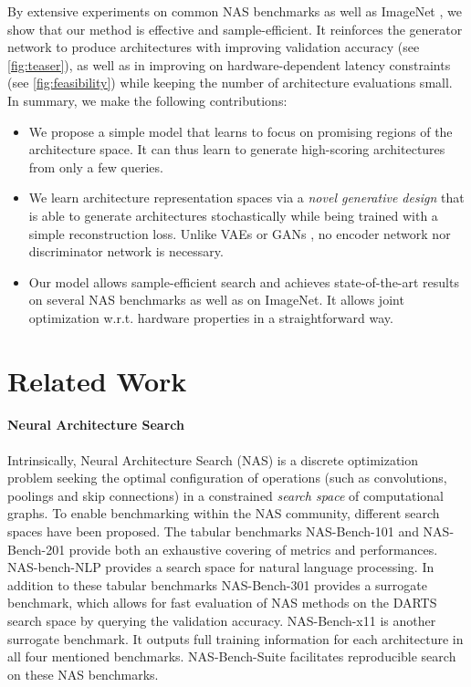 \documentclass[runningheads]{llncs}
\begin{document}
By extensive experiments on common NAS benchmarks \cite{2019NB101,2020NB201,2020NB301,2020NBNLP,2021HWNNB} as well as ImageNet \cite{2009ImageNet}, we show that our method is effective and sample-efficient. It reinforces the generator network to produce architectures with improving validation accuracy (see \autoref{fig:teaser}), as well as in improving on hardware-dependent latency constraints (see \autoref{fig:feasibility}) while keeping the number of architecture evaluations small.
In summary, we make the following contributions:
\begin{itemize}
    \item We propose a simple model that learns to focus on promising regions of the architecture space. It can thus learn to generate high-scoring architectures from only a few queries. \item We learn architecture representation spaces via a \textit{novel generative design} that is able to generate architectures stochastically while being trained with a simple reconstruction loss.
    Unlike VAEs \cite{2014VAE} or GANs \cite{2014GAN}, no encoder network nor discriminator network is necessary.
    \item Our model allows sample-efficient search and achieves state-of-the-art results on several NAS benchmarks as well as on ImageNet. It allows joint optimization w.r.t. hardware properties in a straightforward way.
\end{itemize}


\section{Related Work}
\paragraph{Neural Architecture Search}
Intrinsically, Neural Architecture Search (NAS) is a discrete optimization problem seeking the optimal configuration of operations (such as convolutions, poolings and skip connections) in a constrained \emph{search space} of computational graphs.
To enable benchmarking within the NAS community, different search spaces have been proposed. The tabular benchmarks NAS-Bench-101 \cite{2019NB101} and NAS-Bench-201 \cite{2020NB201} provide both an exhaustive covering of metrics and performances. NAS-bench-NLP \cite{2020NBNLP} provides a search space for natural language processing. 
In addition to these tabular benchmarks NAS-Bench-301 \cite{2020NB301} provides a surrogate benchmark, which allows for fast evaluation of NAS methods on the DARTS \cite{2018DARTS} search space by querying the validation accuracy. NAS-Bench-x11 \cite{2021NBX11} is another  surrogate benchmark. It outputs full training information for each architecture in all four mentioned benchmarks. NAS-Bench-Suite \cite{NBSuite} facilitates reproducible search on these NAS benchmarks. 
\end{document}
